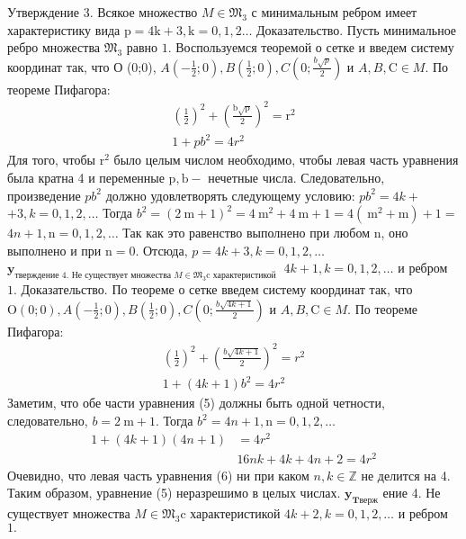 \documentclass[a4paper,openbib]{article}
\begin{document}
Утверждение 3. Всякое множество $M \in \mathfrak{M}_{3}$ с минимальным ребром имеет характеристику вида $\mathrm{p}=4 \mathrm{k}+3, \mathrm{k}=0,1,2 \ldots$
Доказательство. Пусть минимальное ребро множества $\mathfrak{M}_{3}$ равно $1 .$ Воспользуемся теоремой о сетке и введем систему координат так, что О (0;0),
$A\left(-\frac{1}{2} ; 0\right), B\left(\frac{1}{2} ; 0\right), C\left(0 ; \frac{b \sqrt{p}}{2}\right)$ и $A, B, \mathrm{C} \in M .$ По теореме Пифагора:
$$
\begin{array}{c}
\left(\frac{1}{2}\right)^{2}+\left(\frac{\mathrm{b} \sqrt{\mathrm{p}}}{2}\right)^{2}=\mathrm{r}^{2} \\
1+p b^{2}=4 r^{2}
\end{array}
$$
Для того, чтобы $\mathrm{r}^{2}$ было целым числом необходимо, чтобы левая часть уравнения была кратна 4 и переменные $\mathrm{p}, \mathrm{b}-$ нечетные числа. Следовательно, произведение $p b^{2}$ должно удовлетворять следующему условию: $p b^{2}=4 k+$ $+3, k=0,1,2, \ldots$ Тогда $b^{2}=(2 \mathrm{~m}+1)^{2}=4 \mathrm{~m}^{2}+4 \mathrm{~m}+1=4\left(\mathrm{~m}^{2}+\mathrm{m}\right)+1=$
$4 n+1, \mathrm{n}=0,1,2, \ldots$ Так как это равенство выполнено при любом $\mathrm{n}$, оно выполнено и при $\mathrm{n=0.}$ Отсюда, $p=4 k+3, k=0,1,2, \ldots$ $\mathbf{y}_{\text {тверждение } 4 . \text { Не существует множества } M \in \mathfrak{M}_{3} \mathrm{c} \text { характеристикой }}$
$4 k+1, k=0,1,2, \ldots$ и ребром $1 .$
Доказательство. По теореме о сетке введем систему координат так, что $\mathrm{O}(0 ; 0), A\left(-\frac{1}{2} ; 0\right), B\left(\frac{1}{2} ; 0\right), C\left(0 ; \frac{b \sqrt{4 k+1}}{2}\right)$ и $A, B, \mathrm{C} \in M .$ По теореме
Пифагора:
$$
\begin{array}{c}
\left(\frac{1}{2}\right)^{2}+\left(\frac{b \sqrt{4 k+1}}{2}\right)^{2}=r^{2} \\
1+(4 k+1) b^{2}=4 r^{2}
\end{array}
$$
Заметим, что обе части уравнения (5) должны быть одной четности, следовательно, $b=2 \mathrm{~m}+1 .$ Тогда $b^{2}=4 n+1, \mathrm{n}=0,1,2, \ldots$
$$
\begin{aligned}
1+(4 k+1)(4 n+1) &=4 r^{2} \\
& 16 n k+4 k+4 n+2=4 r^{2}
\end{aligned}
$$
Очевидно, что левая часть уравнения (6) ни при каком $n, k \in \mathbb{Z}$ не делится на 4. Таким образом, уравнение (5) неразрешимо в целых числах. $\mathbf{y}_{\mathbf{T в е р} \boldsymbol{ж}}$ ение 4. Не существует множества $M \in \mathfrak{M}_{3} \mathrm{c}$ характеристикой $4 k+2, k=0,1,2, \ldots$ и ребром $1 .$
\end{document}
